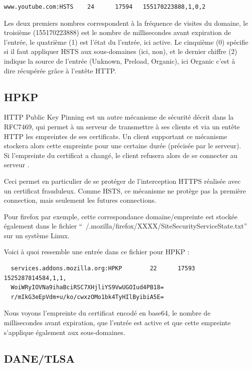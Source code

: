 \begin{verbatim}
www.youtube.com:HSTS    24      17594   155170223888,1,0,2
\end{verbatim}

Les deux premiers nombres correspondent à la fréquence de visites du domaine, le troisième (155170223888) est le nombre de millisecondes avant expiration de l'entrée, le quatrième (1) est l'état du l'entrée, ici active. Le cinquième (0) spécifie si il faut appliquer HSTS aux sous-domaines (ici, non), et le dernier chiffre (2) indique la source de l'entrée (Unknown, Preload, Organic), ici Organic c'est à dire récupérée grâce à l'entête HTTP.

\subsection{HPKP}

HTTP Public Key Pinning est un autre mécanisme de sécurité décrit dans la RFC7469, qui permet à un serveur de transmettre à ses clients et via un entête HTTP les empreintes de ses certificats. Un client supportant ce mécanisme stockera alors cette empreinte pour une certaine durée (précisée par le serveur). Si l'empreinte du certificat a changé, le client refusera alors de se connecter au serveur \cite{hpkp}.

Ceci permet en particulier de se protéger de l'interception HTTPS réalisée avec un certificat frauduleux. Comme HSTS, ce mécanisme ne protège pas la première connection, mais seulement les futures connections.

Pour firefox par exemple, cette correspondance domaine/empreinte est stockée également dans le fichier ``~/.mozilla/firefox/XXXX/SiteSecurityServiceState.txt'' sur un système Linux.

Voici à quoi ressemble une entrée dans ce fichier pour HPKP :

\begin{verbatim}
  services.addons.mozilla.org:HPKP        22      17593   1525287814584,1,1,
  WoiWRyIOVNa9ihaBciRSC7XHjliYS9VwUGOIud4PB18=
  r/mIkG3eEpVdm+u/ko/cwxzOMo1bk4TyHIlByibiA5E=
\end{verbatim}

Nous voyons l'empreinte du certificat encodé en base64, le nombre de millisecondes avant expiration, que l'entrée est active et que cette empreinte s'applique également aux sous-domaines.

\subsection{DANE/TLSA}


